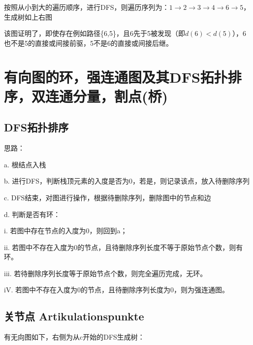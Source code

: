 \documentclass[a4paper]{article}    %
\begin{document}
按照从小到大的遍历顺序，进行DFS，则遍历序列为：$1\rightarrow2\rightarrow3\rightarrow4\rightarrow6\rightarrow5$，生成树如上右图

该图证明了，即使存在例如路径\{6,5\}，且6先于5被发现（即$d(6)<d(5)$），6也不是5的直接或间接前驱，5不是6的直接或间接后继。

\section{有向图的环，强连通图及其DFS拓扑排序，双连通分量，割点(桥)}

\subsection{DFS拓扑排序}

\noindent 思路：

a. 根结点入栈

b. 进行DFS，判断栈顶元素的入度是否为0，若是，则记录该点，放入待删除序列

c. DFS结束，对图进行操作，根据待删除序列，删除图中的节点和边

d. 判断是否有环：
    
\indent\indent i. 若图中存在节点的入度为0，则回到a；

\indent\indent ii. 若图中不存在入度为0的节点，且待删除序列长度不等于原始节点个数，则有环。

\indent\indent iii. 若待删除序列长度等于原始节点个数，则完全遍历完成，无环。

\indent\indent iV. 若图中不存在入度为0的节点，且待删除序列长度为0，则为强连通图。


\subsection{关节点 Artikulationspunkte}

\noindent 有无向图如下，右侧为从c开始的DFS生成树：
\end{document}
